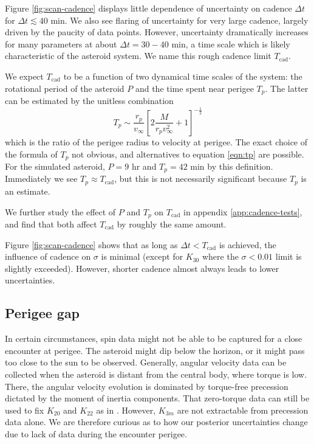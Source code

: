 \documentclass[fleqn,usenatbib]{mnras}
\newcommand{\brackets}[1]{\left[ #1 \right]}
\begin{document}
Figure \ref{fig:scan-cadence} displays little dependence of uncertainty on cadence $\Delta t$ for $\Delta t \lesssim 40$ min. We also see flaring of uncertainty for very large cadence, largely driven by the paucity of data points. However, uncertainty dramatically increases for many parameters at about $\Delta t = 30-40$ min, a time scale which is likely characteristic of the asteroid system. We name this rough cadence limit $T_\text{cad}$.

We expect $T_\text{cad}$ to be a function of two dynamical time scales of the system: the rotational period of the asteroid $P$ and the time spent near perigee $T_p$. The latter can be estimated by the unitless combination
\begin{equation}
  T_p \sim \frac{r_p}{v_\infty}\brackets{2\frac{M}{r_pv_\infty^2}+1}^{-\frac{1}{2}}
  \label{eqn:tp}
\end{equation}
which is the ratio of the perigee radius to velocity at perigee. The exact choice of the formula of $T_p$ not obvious, and alternatives to equation \ref{eqn:tp} are possible. For the simulated asteroid, $P = 9$ hr and $T_p = 42$ min by this definition. Immediately we see $T_p \approx T_\text{cad}$, but this is not necessarily significant because $T_p$ is an estimate.

We further study the effect of $P$ and $T_p$ on $T_\text{cad}$ in appendix \ref{app:cadence-tests}, and find that both affect $T_\text{cad}$ by roughly the same amount.

Figure \ref{fig:scan-cadence} shows that as long as $\Delta t < T_\text{cad}$ is achieved, the influence of cadence on $\sigma$ is minimal (except for $K_{30}$ where the $\sigma<0.01$ limit is slightly exceeded). However, shorter cadence almost always leads to lower uncertainties.



\subsection{Perigee gap}
\label{sec:scan-gap}
In certain circumstances, spin data might not be able to be captured for a close encounter at perigee. The asteroid might dip below the horizon, or it might pass too close to the sun to be observed. Generally, angular velocity data can be collected when the asteroid is distant from the central body, where torque is low. There, the angular velocity evolution is dominated by torque-free precession dictated by the moment of inertia components. That zero-torque data can still be used to fix $K_{20}$ and $K_{22}$ as in \cite{MOSKOVITZ2020113519}. However, $K_{3m}$ are not extractable from precession data alone. We are therefore curious as to how our posterior uncertainties change due to lack of data during the encounter perigee.
\end{document}
